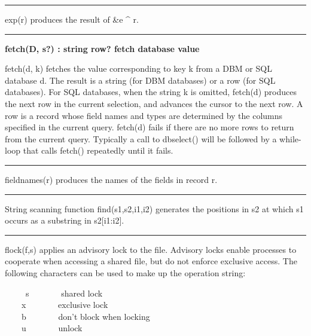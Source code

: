 \bigskip\hrule\vspace{0.1cm}

\noindent
{}exp(r) produces the result of \&e \^{} r.

\bigskip\hrule\vspace{0.1cm}
\noindent
{\bf fetch(D, s?) : string {\textbar} row? \hfill fetch database value}

\noindent
{}fetch(d, k) fetches the value corresponding to key k
from a DBM or SQL database d. The result is
a string (for DBM databases) or a row (for SQL databases). For SQL
databases, when the string k is omitted, fetch(d) produces the next row
in the current selection, and advances the cursor to the next row. A
row is a record whose field names and types are determined by the
columns specified in the current query. fetch(d) fails if there are no
more rows to return from the current query. Typically a call to
dbselect() will be followed by a while{}-loop that calls fetch()
repeatedly until it fails.

\bigskip\hrule\vspace{0.1cm}

\noindent
{}fieldnames(r) produces the names of the fields in
record r.

\bigskip\hrule\vspace{0.1cm}

\noindent
{}String scanning function find(s1,s2,i1,i2) generates
the positions in s2 at which s1 occurs as a substring in s2[i1:i2].

\bigskip\hrule\vspace{0.1cm}

\noindent
{}flock(f,s) applies an advisory
lock to the file. Advisory locks enable processes to
cooperate when accessing a shared file, but do not enforce exclusive
access. The following characters can be used to make up the operation
string: 

\ \ \ \ \ s \ \ \ \ \ \ \ shared lock\\
 \ \ \ \ x \ \ \ \ \ \ \ exclusive lock\\
 \ \ \ \ b \ \ \ \ \ \ \ don't block when
locking\\
 \ \ \ \ u \ \ \ \ \ \ \ unlock 

